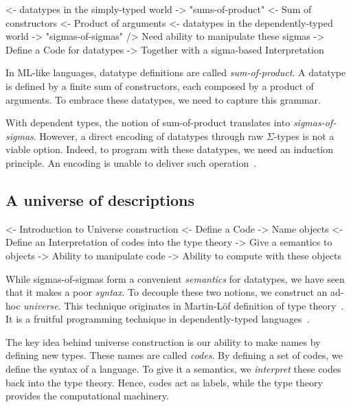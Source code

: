 \begin{wstructure}
<- datatypes in the simply-typed world
    -> "sums-of-product"
        <- Sum of constructors
        <- Product of arguments
<- datatypes in the dependently-typed world
    -> "sigmas-of-sigmas"
    /> Need ability to manipulate these sigmas
        -> Define a Code for datatypes
        -> Together with a sigma-based Interpretation
\end{wstructure}

In ML-like languages, datatype definitions are called
\emph{sum-of-product}. A datatype is defined by a finite sum of
constructors, each composed by a product of arguments. To embrace
these datatypes, we need to capture this grammar.

With dependent types, the notion of sum-of-product translates into
\emph{sigmas-of-sigmas}. However, a direct encoding of datatypes
through raw $\Sigma$-types is not a viable option. Indeed, to program
with these datatypes, we need an induction principle. An encoding is
unable to deliver such
operation~\cite{geuvers:induction-not-derivable}.


\subsection{A universe of descriptions}
\label{sec:desc-universe}

\begin{wstructure}
<- Introduction to Universe construction
    <- Define a Code
        -> Name objects
    <- Define an Interpretation of codes into the type theory
        -> Give a semantics to objects
    -> Ability to manipulate code
    -> Ability to compute with these objects
\end{wstructure}

While sigmas-of-sigmas form a convenient \emph{semantics} for
datatypes, we have seen that it makes a poor \emph{syntax}. To
decouple these two notions, we construct an ad-hoc
\emph{universe}. This technique originates in Martin-L\"of definition
of type theory~\cite{martin-lof:itt}. It is a fruitful programming
technique in dependently-typed
languages~\cite{benke:universe-generic-prog, oury:power-of-pi}.

The key idea behind universe construction is our ability to make names
by defining new types. These names are called \emph{codes}. By
defining a set of codes, we define the syntax of a language. To give
it a semantics, we \emph{interpret} these codes back into the type
theory. Hence, codes act as labels, while the type theory provides the
computational machinery.

